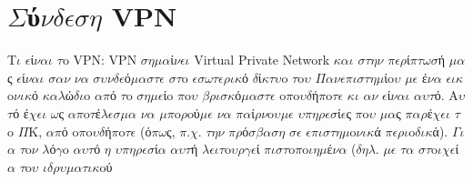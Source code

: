 \documentclass[a4paper,11pt,english]{sphinxmanual}
\begin{document}
\section{\(\Sigma\)ύ\(\nu\)\(\delta\)\(\epsilon\)\(\sigma\)\(\eta\) VPN}
\label{\detokenize{HowToVPN:vpn}}\label{\detokenize{HowToVPN::doc}}
T\(\iota\) \(\epsilon\)ί\(\nu\)\(\alpha\)\(\iota\) \(\tau\)o VPN: VPN \(\sigma\)\(\eta\)\(\mu\)\(\alpha\)ί\(\nu\)\(\epsilon\)\(\iota\) Virtual Private Network \(\kappa\)\(\alpha\)\(\iota\) \(\sigma\)\(\tau\)\(\eta\)\(\nu\)
\(\pi\)\(\epsilon\)\(\rho\)ί\(\pi\)\(\tau\)\(\omega\)\(\sigma\)ή \(\mu\)\(\alpha\)ς \(\epsilon\)ί\(\nu\)\(\alpha\)\(\iota\) \(\sigma\)\(\alpha\)\(\nu\) \(\nu\)\(\alpha\) \(\sigma\)\(\upsilon\)\(\nu\)\(\delta\)\(\epsilon\)ό\(\mu\)\(\alpha\)\(\sigma\)\(\tau\)\(\epsilon\) \(\sigma\)\(\tau\)o \(\epsilon\)\(\sigma\)\(\omega\)\(\tau\)\(\epsilon\)\(\rho\)\(\iota\)\(\kappa\)ό \(\delta\)ί\(\kappa\)\(\tau\)\(\upsilon\)o \(\tau\)o\(\upsilon\)
\(\Pi\)\(\alpha\)\(\nu\)\(\epsilon\)\(\pi\)\(\iota\)\(\sigma\)\(\tau\)\(\eta\)\(\mu\)ίo\(\upsilon\) \(\mu\)\(\epsilon\) έ\(\nu\)\(\alpha\) \(\epsilon\)\(\iota\)\(\kappa\)o\(\nu\)\(\iota\)\(\kappa\)ό \(\kappa\)\(\alpha\)\(\lambda\)ώ\(\delta\)\(\iota\)o \(\alpha\)\(\pi\)ό \(\tau\)o \(\sigma\)\(\eta\)\(\mu\)\(\epsilon\)ίo \(\pi\)o\(\upsilon\) \(\beta\)\(\rho\)\(\iota\)\(\sigma\)\(\kappa\)ό\(\mu\)\(\alpha\)\(\sigma\)\(\tau\)\(\epsilon\)
o\(\pi\)o\(\upsilon\)\(\delta\)ή\(\pi\)o\(\tau\)\(\epsilon\) \(\kappa\)\(\iota\) \(\alpha\)\(\nu\) \(\epsilon\)ί\(\nu\)\(\alpha\)\(\iota\) \(\alpha\)\(\upsilon\)\(\tau\)ό. A\(\upsilon\)\(\tau\)ό έ\(\chi\)\(\epsilon\)\(\iota\) \(\omega\)ς \(\alpha\)\(\pi\)o\(\tau\)έ\(\lambda\)\(\epsilon\)\(\sigma\)\(\mu\)\(\alpha\) \(\nu\)\(\alpha\) \(\mu\)\(\pi\)o\(\rho\)oύ\(\mu\)\(\epsilon\)
\(\nu\)\(\alpha\) \(\pi\)\(\alpha\)ί\(\rho\)\(\nu\)o\(\upsilon\)\(\mu\)\(\epsilon\) \(\upsilon\)\(\pi\)\(\eta\)\(\rho\)\(\epsilon\)\(\sigma\)ί\(\epsilon\)ς \(\pi\)o\(\upsilon\) \(\mu\)\(\alpha\)ς \(\pi\)\(\alpha\)\(\rho\)έ\(\chi\)\(\epsilon\)\(\iota\) \(\tau\)o \(\Pi\)K, \(\alpha\)\(\pi\)ό o\(\pi\)o\(\upsilon\)\(\delta\)ή\(\pi\)o\(\tau\)\(\epsilon\) (ό\(\pi\)\(\omega\)ς,
\(\pi\).\(\chi\). \(\tau\)\(\eta\)\(\nu\) \(\pi\)\(\rho\)ό\(\sigma\)\(\beta\)\(\alpha\)\(\sigma\)\(\eta\) \(\sigma\)\(\epsilon\) \(\epsilon\)\(\pi\)\(\iota\)\(\sigma\)\(\tau\)\(\eta\)\(\mu\)o\(\nu\)\(\iota\)\(\kappa\)ά \(\pi\)\(\epsilon\)\(\rho\)\(\iota\)o\(\delta\)\(\iota\)\(\kappa\)ά). \(\Gamma\)\(\iota\)\(\alpha\) \(\tau\)o\(\nu\) \(\lambda\)ό\(\gamma\)o \(\alpha\)\(\upsilon\)\(\tau\)ό \(\eta\)
\(\upsilon\)\(\pi\)\(\eta\)\(\rho\)\(\epsilon\)\(\sigma\)ί\(\alpha\) \(\alpha\)\(\upsilon\)\(\tau\)ή \(\lambda\)\(\epsilon\)\(\iota\)\(\tau\)o\(\upsilon\)\(\rho\)\(\gamma\)\(\epsilon\)ί \(\pi\)\(\iota\)\(\sigma\)\(\tau\)o\(\pi\)o\(\iota\)\(\eta\)\(\mu\)έ\(\nu\)\(\alpha\) (\(\delta\)\(\eta\)\(\lambda\). \(\mu\)\(\epsilon\) \(\tau\)\(\alpha\) \(\sigma\)\(\tau\)o\(\iota\)\(\chi\)\(\epsilon\)ί\(\alpha\) \(\tau\)o\(\upsilon\) \(\iota\)\(\delta\)\(\rho\)\(\upsilon\)\(\mu\)\(\alpha\)\(\tau\)\(\iota\)\(\kappa\)oύ
\end{document}

